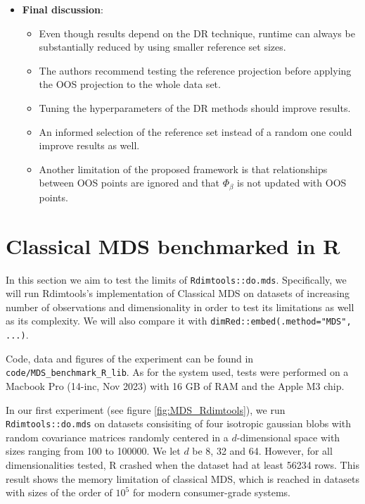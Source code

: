 \documentclass[a4paper,12pt]{article}
\begin{document}
\begin{itemize}
    \item \textbf{Final discussion}:
    \begin{itemize}
        \item Even though results depend on the DR technique, runtime can always be substantially reduced by using smaller reference set sizes.
        \item The authors recommend testing the reference projection before applying the OOS projection to the whole data set.
        \item Tuning the hyperparameters of the DR methods should improve results.
        \item An informed selection of the reference set instead of a random one could improve results as well.
        \item Another limitation of the proposed framework is that relationships between OOS points are ignored and that $\Phi_{\beta}$ is not updated with OOS points.
    \end{itemize}
\end{itemize}


\pagebreak
\section{Classical MDS benchmarked in R}

In this section we aim to test the limits of \texttt{Rdimtools::do.mds}. Specifically, we will run Rdimtools's implementation of Classical MDS on datasets of increasing number of observations and dimensionality in order to test its limitations as well as its complexity. We will also compare it with \texttt{dimRed::embed(.method="MDS", ...)}.

Code, data and figures of the experiment can be found in \verb$code/MDS_benchmark_R_lib$. As for the system used, tests were performed on a Macbook Pro (14-inc, Nov 2023) with 16 GB of RAM and the Apple M3 chip.

In our first experiment (see figure \ref{fig:MDS_Rdimtools}), we run \texttt{Rdimtools::do.mds} on datasets consisiting of four isotropic gaussian blobs with random covariance matrices randomly centered in a $d$-dimensional space with sizes ranging from 100 to 100000. We let $d$ be 8, 32 and 64. However, for all dimensionalities tested, R crashed when the dataset had at least 56234 rows. This result shows the memory limitation of classical MDS, which is reached in datasets with sizes of the order of $10^5$ for modern consumer-grade systems.
\end{document}
